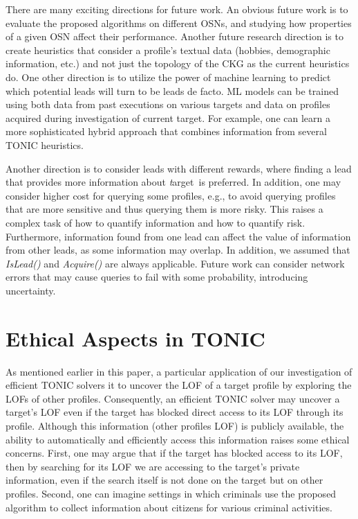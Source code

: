 \documentclass[journal]{IEEEtran}
\newcommand{\islead}[1]{{\em IsLead(#1)}}
\newcommand{\acquire}[1]{{\em Acquire(#1)}}
\newcommand{\target}{{\textit target}}
\begin{document}


There are many exciting directions for future work.
An obvious future work is to evaluate the proposed algorithms on different OSNs, and studying how properties of a given OSN affect their performance. 
Another future research direction is to create heuristics that consider a profile's textual data (hobbies, demographic information, etc.) and not just the topology of the CKG as the current heuristics do.
One other direction is to utilize the power of machine learning to predict which potential leads will turn to be leads de facto.
ML models can be trained using both data from past executions on various targets and data on profiles acquired during investigation of current target. 
For example, one can learn a more sophisticated hybrid approach that combines information from several TONIC heuristics. 

Another direction is to consider leads with different rewards, where finding a lead that provides more information about \target\ is preferred. 
In addition, one may consider higher cost for querying some profiles, e.g., to avoid querying profiles that are more sensitive and thus querying them is more risky. This raises a complex task of how to quantify information and how to quantify risk. Furthermore, information found from one lead can affect the value of information from other leads, as some information may overlap. In addition, we assumed that \islead{} and \acquire{} are always applicable. Future work can consider network errors that may cause queries to fail with some probability, introducing uncertainty.




\section{Ethical Aspects in TONIC}
\label{sec:ethics}

As mentioned earlier in this paper, a particular application of our investigation of efficient TONIC solvers it to uncover the LOF of a target profile 
by exploring the LOFs of other profiles. Consequently, an efficient TONIC solver may uncover a target's LOF even if the target has blocked direct access to its LOF through its profile. Although this information (other profiles LOF) is publicly available, the ability to automatically and efficiently access this information raises some ethical concerns. 
First, one may argue that if the target has blocked access to its LOF, then by searching for its LOF we are accessing to the target's private information, even if the search itself is not done on the target but on other profiles. 
Second, one can imagine settings in which criminals use the proposed algorithm to collect information about citizens for various criminal activities. 
\end{document}
